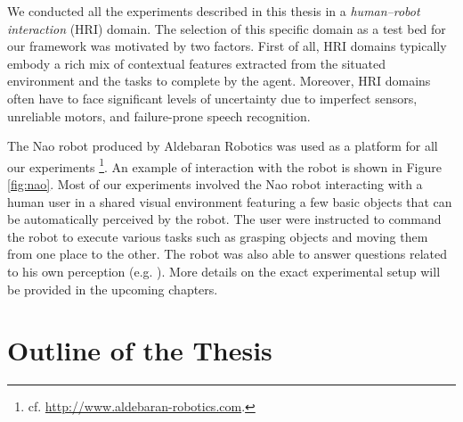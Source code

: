 We conducted all the experiments described in this thesis in a \textit{human--robot interaction}  (HRI) domain.  The selection of this specific domain as a test bed for our framework was motivated by two factors.  First of all, HRI domains typically embody a rich mix of contextual features extracted from the situated environment and the tasks to complete by the agent. Moreover, HRI domains often have to face significant levels of uncertainty due to imperfect sensors, unreliable motors, and failure-prone speech recognition. 

The Nao robot produced by Aldebaran Robotics was used as a platform for all our experiments \footnote{cf.  \url{http://www.aldebaran-robotics.com}.}.  An example of interaction with the robot is shown in Figure \ref{fig:nao}.  Most of our experiments involved the Nao robot interacting with a human user in a shared visual environment featuring a few basic objects that can be automatically perceived by the robot.  The user were instructed to command the robot to execute various tasks such as grasping objects and moving them from one place to the other.  The robot was also able to answer questions related to his own perception (e.g. ).  More details on the exact experimental setup will be provided in the upcoming chapters. 

\section{Outline of the Thesis}

